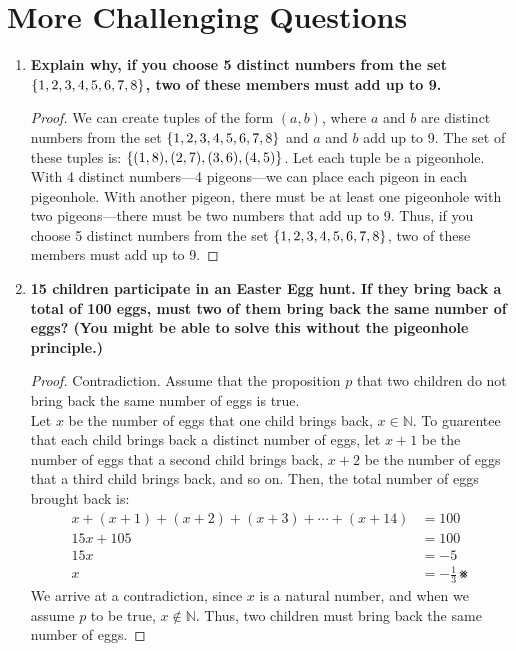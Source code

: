 \documentclass[article, 12pt]{article}
\theoremstyle{definition}
\DeclarePairedDelimiter\set{\{}{\}}
\newcommand{\nats}{\mathbb{N}}
\begin{document}
\section{More Challenging Questions}
\begin{enumerate}[(1)]
    \item \textbf{Explain why, if you choose 5 distinct numbers from the set $\set*{1,2,3,4,5,6,7,8}$, two of these members must add up to 9.}
    \begin{proof}
        We can create tuples of the form $(a,b)$, where $a$ and $b$ are distinct numbers from the set $\set*{1,2,3,4,5,6,7,8}$ and $a$ and $b$ add up to 9. The set of these tuples is: $\set*{(1,8),(2,7),(3,6),(4,5)}$. Let each tuple be a pigeonhole. With 4 distinct numbers---4 pigeons---we can place each pigeon in each pigeonhole. With another pigeon, there must be at least one pigeonhole with two pigeons---there must be two numbers that add up to 9. Thus, if you choose 5 distinct numbers from the set $\set*{1,2,3,4,5,6,7,8}$, two of these members must add up to 9.
    \end{proof}
    \item \textbf{15 children participate in an Easter Egg hunt. If they bring back a total of 100 eggs, must two of them bring back the same number of eggs? (You might be able to solve this without the pigeonhole principle.)}
    \begin{proof} Contradiction. Assume that the proposition $p$ that two children do not bring back the same number of eggs is true. \\
        Let $x$ be the number of eggs that one child brings back, $x \in \nats$. To guarentee that each child brings back a distinct number of eggs, let $x+1$ be the number of eggs that a second child brings back, $x+2$ be the number of eggs that a third child brings back, and so on. Then, the total number of eggs brought back is:
    \begin{align*}
        x+(x+1)+(x+2)+(x+3)+\cdots+(x+14) &= 100 \\
        15x+105 &= 100 \\
        15x &= -5 \\
        x &= -\frac{1}{3} \smashtimes
    \end{align*}
    We arrive at a contradiction, since $x$ is a natural number, and when we assume $p$ to be true, $x \notin \nats$. Thus, two children must bring back the same number of eggs.
    \end{proof}

\end{enumerate}
\end{document}
